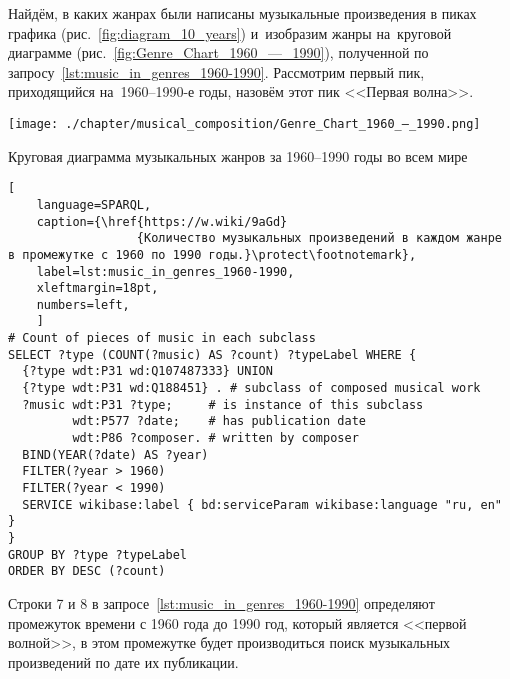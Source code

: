 Найдём, в каких жанрах были написаны музыкальные произведения 
в пиках графика (рис.~\ref{fig:diagram_10_years}) 
и~изобразим жанры на~круговой диаграмме (рис.~\ref{fig:Genre_Chart_1960_—_1990}), 
полученной по запросу~\ref{lst:music_in_genres_1960-1990}. 
Рассмотрим первый пик, приходящийся на~1960--1990-е годы, назовём этот пик <<Первая волна>>.

\begin{marginfigure}[0\baselineskip]
	\texttt{[image: ./chapter/musical\_composition/Genre\_Chart\_1960\_—\_1990.png]}
	\caption{Круговая диаграмма музыкальных жанров за 1960--1990 годы во всем мире}%
	\label{fig:Genre_Chart_1960_—_1990}%
\end{marginfigure}

\begin{lstlisting}[ 
    language=SPARQL,
    caption={\href{https://w.wiki/9aGd}
                  {Количество музыкальных произведений в каждом жанре в промежутке с 1960 по 1990 годы.}\protect\footnotemark},
    label=lst:music_in_genres_1960-1990,
    xleftmargin=18pt,
    numbers=left,
    ]
# Count of pieces of music in each subclass
SELECT ?type (COUNT(?music) AS ?count) ?typeLabel WHERE {
  {?type wdt:P31 wd:Q107487333} UNION 
  {?type wdt:P31 wd:Q188451} . # subclass of composed musical work
  ?music wdt:P31 ?type;     # is instance of this subclass
         wdt:P577 ?date;    # has publication date
         wdt:P86 ?composer. # written by composer
  BIND(YEAR(?date) AS ?year)
  FILTER(?year > 1960)        
  FILTER(?year < 1990)
  SERVICE wikibase:label { bd:serviceParam wikibase:language "ru, en" }
}
GROUP BY ?type ?typeLabel
ORDER BY DESC (?count)
\end{lstlisting}%

Строки 7 и 8 в запросе~\ref{lst:music_in_genres_1960-1990} определяют промежуток времени с 1960 года до 1990 год, который является <<первой волной>>, в этом промежутке будет производиться поиск музыкальных произведений по дате их публикации.




